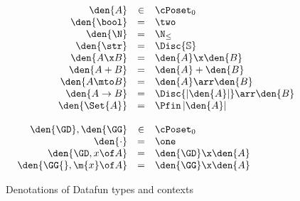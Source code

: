 
\begin{figure}
  \[\begin{array}{rcl}
  \den{A} &\in& \cPoset_0\\
  \den{\bool} &=& \two\\
  \den{\N} &=& \N_\le\\
  \den{\str} &=& \Disc{\mathbb{S}}\\
  \den{A \x B} &=& \den{A} \x \den{B}\\
  \den{A + B} &=& \den{A} + \den{B}\\
  \den{A \mto B} &=& \den{A} \arr \den{B}\\
  \den{A \uto B} &=& \Disc{\U{\den{A}}} \arr \den{B}\\
  \den{\Set{A}} &=& \Pfin\,{\U{\den{A}}}
  \\\\
  \den{\GD}, \den{\GG} &\in& \cPoset_0\\
  \den{\cdot} &=& \one\\
  \den{\GD, x\of A} &=& \den{\GD} \x \den{A}\\
  \den{\GG{}, \m{x}\of A} &=& \den{\GG} \x \den{A}
  \end{array}\]
  \caption{Denotations of Datafun types and contexts}
  \label{fig:sem-types}
\end{figure}


\newcommand{\fux}[2]{\Den{\vcenter{\infer{#1}{#2}}}}
\newcommand{\dg}{\;\delta\;\gamma}

